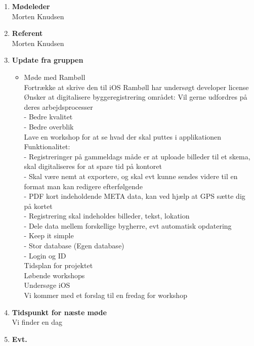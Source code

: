 	\begin{enumerate}
		\itemsep 0.3em 
		\item \textbf{Mødeleder}\\
			Morten Knudsen
		\item \textbf{Referent}\\
			Morten Knudsen

		\item \textbf{Update fra gruppen}
			\begin{itemize}[-]
			\item Møde med Rambøll\\
				Fortrække at skrive den til iOS
				Rambøll har undersøgt developer license
				Ønsker at digitalisere byggeregistrering området:
				Vil gerne udfordres på deres arbejdsprocesser \\
				 - Bedre kvalitet \\
				 - Bedre overblik \\
				 Lave en workshop for at se hvad der skal puttes i applikationen \\
				 
				Funktionalitet: \\
				- Registreringer på gammeldags måde er at uploade billeder til et skema, skal digitaliseres for at spare tid på kontoret \\
				- Skal være nemt at exportere, og skal evt kunne sendes videre til en format man kan redigere efterfølgende \\
				- PDF kort indeholdende META data, kan ved hjælp at GPS sætte dig på kortet \\
				- Registrering skal indeholdes billeder, tekst, lokation \\
				- Dele data mellem forskellige bygherre, evt automatisk opdatering \\
				- Keep it simple \\
				- Stor database (Egen database) \\
				- Login og ID \\
				
				Tidsplan for projektet \\
				Løbende workshops \\
				Undersøge iOS \\
				Vi kommer med et forslag til en fredag for workshop \\
			
		\end{itemize}	
		\item \textbf{Tidspunkt for næste møde}\\
		Vi finder en dag
		\item \textbf{Evt.}
	\end{enumerate}
